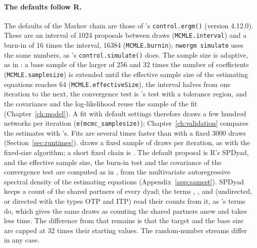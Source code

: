 \paragraph{The defaults follow R.}\label{sec:mcmcopts} The defaults of the Markov chain are those of \ergm{}'s \texttt{control.ergm()} (version 4.12.0). These are an interval of 1024 proposals between draws (\texttt{MCMLE.interval}) and a burn-in of 16 times the interval, 16384 (\texttt{MCMLE.burnin}); \texttt{nwergm simulate} uses the same numbers, as \ergm{}'s \texttt{control.simulate()} does. The sample size is adaptive, as in \ergm{}: a base sample of the larger of 256 and 32 times the number of coefficients (\texttt{MCMLE.samplesize}) is extended until the effective sample size of the estimating equations reaches 64 (\texttt{MCMLE.effectiveSize}), the interval halves from one iteration to the next, the convergence test is \ergm{}'s test with a tolerance region, and the covariance and the log-likelihood reuse the sample of the fit (Chapter~\ref{ch:model}). A fit with default settings therefore draws a few hundred networks per iteration (\texttt{e(mcmc\_samplesize)}); Chapter~\ref{ch:validation} compares the estimates with \ergm{}'s. Fits are several times faster than with a fixed 3000 draws (Section~\ref{sec:runtimes}).  draws a fixed sample of  draws per iteration, as with the fixed-size algorithm; a short fixed chain is . The default proposal is R's SPDyad, and the effective sample size, the burn-in test and the covariance of the convergence test are computed as in \ergm{}, from the multivariate autoregressive spectral density of the estimating equations (Appendix~\ref{app:samest}). SPDyad keeps a count of the shared partners of every dyad; the terms , ,  and  (undirected, or directed with the types OTP and ITP) read their counts from it, as \ergm{}'s terms do, which gives the same draws as counting the shared partners anew and takes less time. The difference from \ergm{} that remains is that the target and the base size are capped at 32 times their starting values. The random-number streams differ in any case.

